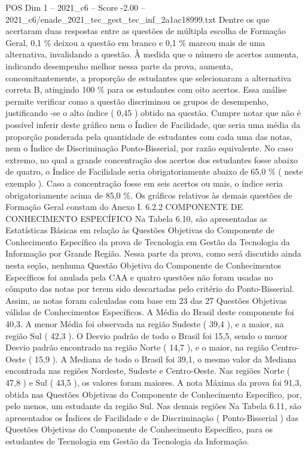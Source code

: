 \begin{textsample}{POS Dim 1 – 2021\_c6 – Score -2.00 – 2021\_c6/enade\_2021\_tec\_gest\_tec\_inf\_2a1ac18999.txt}
Dentre os que acertaram duas respostas entre as questões de múltipla escolha de Formação Geral, 0,1 \% deixou a questão em branco e 0,1 \% marcou mais de uma alternativa, invalidando a questão.
À medida que o número de acertos aumenta, indicando desempenho melhor nessa parte da prova, aumenta, concomitantemente, a proporção de estudantes que selecionaram a alternativa correta B, atingindo 100 \% para os estudantes com oito acertos.
Essa análise permite verificar como a questão discriminou os grupos de desempenho, justificando -se o alto índice ( 0,45 ) obtido na questão.
Cumpre notar que não é possível inferir deste gráfico nem o Índice de Facilidade, que seria uma média da proporção ponderada pela quantidade de estudantes com cada uma das notas, nem o Índice de Discriminação Ponto-Bisserial, por razão equivalente.
No caso extremo, no qual a grande concentração dos acertos dos estudantes fosse abaixo de quatro, o Índice de Facilidade seria obrigatoriamente abaixo de 65,0 \% ( neste exemplo ).
Caso a concentração fosse em seis acertos ou mais, o índice seria obrigatoriamente acima de 85,0 \%.
Os gráficos relativos às demais questões de Formação Geral constam do Anexo I. 6.2.2 COMPONENTE DE CONHECIMENTO ESPECÍFICO Na Tabela 6.10, são apresentadas as Estatísticas Básicas em relação às Questões Objetivas do Componente de Conhecimento Específico da prova de Tecnologia em Gestão da Tecnologia da Informação por Grande Região.
Nessa parte da prova, como será discutido ainda nesta seção, nenhuma Questão Objetiva do Componente de Conhecimentos Específicos foi anulada pela CAA e quatro questões não foram usadas no cômputo das notas por terem sido descartadas pelo critério do Ponto-Bisserial.
Assim, as notas foram calculadas com base em 23 das 27 Questões Objetivas válidas de Conhecimentos Específicos.
A Média do Brasil deste componente foi 40,3.
A menor Média foi observada na região Sudeste ( 39,4 ), e a maior, na região Sul ( 42,3 ).
O Desvio padrão de todo o Brasil foi 15,5, sendo o menor Desvio padrão encontrado na região Norte ( 14,7 ), e o maior, na região Centro-Oeste ( 15,9 ).
A Mediana de todo o Brasil foi 39,1, o mesmo valor da Mediana encontrada nas regiões Nordeste, Sudeste e Centro-Oeste.
Nas regiões Norte ( 47,8 ) e Sul ( 43,5 ), os valores foram maiores.
A nota Máxima da prova foi 91,3, obtida nas Questões Objetivas do Componente de Conhecimento Específico, por, pelo menos, um estudante da região Sul.
Nas demais regiões Na Tabela 6.11, são apresentados os Índices de Facilidade e de Discriminação ( Ponto-Bisserial ) das Questões Objetivas do Componente de Conhecimento Específico, para os estudantes de Tecnologia em Gestão da Tecnologia da Informação.

\end{textsample}
